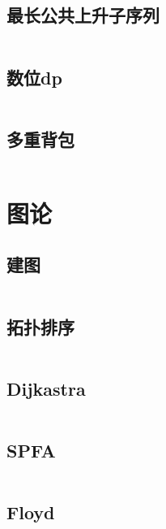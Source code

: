 \documentclass[a4paper]{article}
\newcommand{\cppcode}[1]{
    \inputminted[mathescape]{cpp}{#1}
}
\begin{document}
\cppcode{dynamic-programming/LIS.cpp}

\subsection{最长公共上升子序列}

\cppcode{dynamic-programming/LCIS.cpp}

\subsection{数位dp}

\cppcode{dynamic-programming/Digit-dp.cpp}

\subsection{多重背包}

\cppcode{dynamic-programming/MultiPack.cpp}





\section{图论}

\subsection{建图}

\cppcode{graph/Graph-Set.cpp}

\subsection{拓扑排序}

\cppcode{graph/TopoSort.cpp}

\subsection{Dijkastra}

\cppcode{graph/Dijkstra(pq).cpp}

\subsection{SPFA}

\cppcode{graph/spfa.cpp}

\subsection{Floyd}
\end{document}

